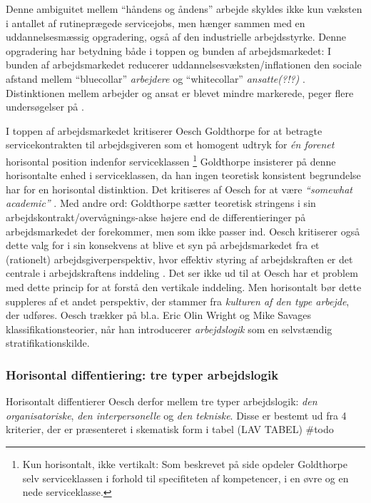 Denne ambiguitet mellem “håndens og åndens” arbejde skyldes ikke kun væksten i antallet af rutineprægede servicejobs, men hænger sammen med en uddannelsesmæssig opgradering, også af den industrielle arbejdsstyrke. Denne opgradering har betydning både i toppen og bunden af arbejdsmarkedet: I bunden af arbejdsmarkedet
reducerer uddannelsesvæksten/inflationen den sociale afstand mellem “bluecollar” \emph{arbejdere} og “whitecollar” \emph{ansatte(?!?)} . Distinktionen mellem arbejder og ansat er blevet mindre markerede, peger flere undersøgelser på \parencite[49]{Oesch2006a}. 

I toppen af arbejdsmarkedet kritiserer Oesch Goldthorpe for at betragte servicekontrakten til arbejdsgiveren som et homogent udtryk for \emph{én forenet} horisontal position indenfor serviceklassen%
%
\footnote{ Kun horisontalt, ikke vertikalt: Som beskrevet på side \pageref{klasse egp11} opdeler Goldthorpe selv serviceklassen i forhold til specifiteten af kompetencer, i en øvre og en nede serviceklasse.}%
%
Goldthorpe insisterer på denne horisontalte enhed i serviceklassen, da han ingen teoretisk konsistent begrundelse har for en horisontal distinktion. Det kritiseres af Oesch for at være \emph{“somewhat academic”} \parencite[53]{Oesch2006a}. Med andre ord: Goldthorpe sætter teoretisk stringens i sin arbejdskontrakt/overvågnings-akse højere end de differentieringer på arbejdsmarkedet der forekommer, men som ikke passer ind. Oesch kritiserer også dette valg for i sin konsekvens at blive et syn på arbejdsmarkedet fra et (rationelt) arbejdsgiverperspektiv, hvor effektiv styring af arbejdskraften er det centrale i arbejdskraftens inddeling \parencite[53]{Oesch2006a}. Det ser ikke ud til at Oesch har et problem med dette princip for at forstå den vertikale inddeling. Men horisontalt bør dette suppleres af et andet perspektiv, der stammer fra \emph{kulturen af den type arbejde}, der udføres. Oesch trækker på bl.a. Eric Olin Wright og Mike Savages klassifikationsteorier, når han introducerer \emph{arbejdslogik} som en selvstændig stratifikationskilde. 

%
\subsubsection{Horisontal diffentiering: tre typer arbejdslogik}
%

Horisontalt diffentierer Oesch derfor mellem tre typer arbejdslogik: \emph{den organisatoriske}, \emph{den interpersonelle} og \emph{den tekniske}. Disse er bestemt ud fra 4 kriterier, der er præsenteret i skematisk form i tabel (LAV TABEL) \#todo 

